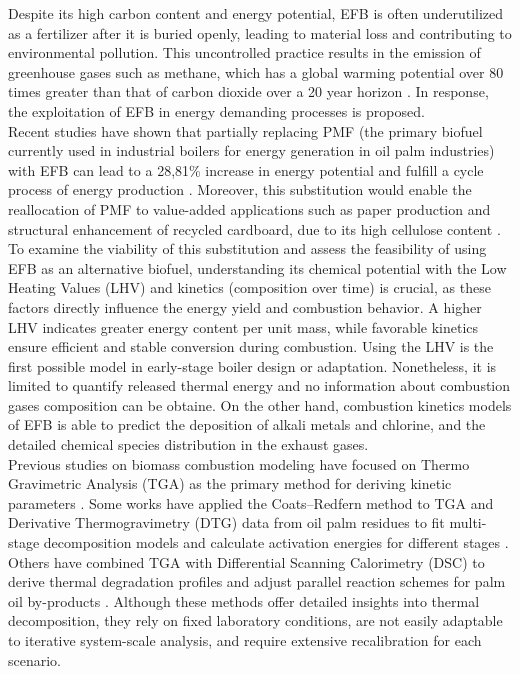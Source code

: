 \documentclass[preprint,12pt]{elsarticle}
\begin{document}
Despite its high carbon content and energy potential, EFB is often underutilized as a fertilizer after it is buried openly, leading to material loss and contributing to environmental pollution. This uncontrolled practice results in the emission of greenhouse gases such as methane, which has a global warming potential over 80 times greater than that of carbon dioxide over a 20 year horizon \cite{NacionesUnidasMetano}. In response, the exploitation of EFB in energy demanding processes is proposed.\\

Recent studies have shown that partially replacing PMF (the primary biofuel currently used in industrial boilers for energy generation in oil palm industries) with EFB can lead to a 28,81\% increase in energy potential and fulfill a cycle process of energy production \cite{BayonaRaquis}. Moreover, this substitution would enable the reallocation of PMF to value-added applications such as paper production and structural enhancement of recycled cardboard, due to its high cellulose content \cite{WanRosli2011, Angarita2009}. \\

To examine the viability of this substitution and assess the feasibility of using EFB as an alternative biofuel, understanding its chemical potential with the Low Heating Values (LHV) and kinetics (composition over time) is crucial, as these factors directly influence the energy yield and combustion behavior. A higher LHV indicates greater energy content per unit mass, while favorable kinetics ensure efficient and stable conversion during combustion. Using the LHV is the first possible model in early-stage boiler design or adaptation. Nonetheless, it is limited to quantify released thermal energy and no information about combustion gases composition can be obtaine. On the other hand, combustion kinetics models of EFB is able to predict the deposition of alkali metals and chlorine, and the detailed chemical species distribution in the exhaust gases. \\%

Previous studies on biomass combustion modeling have focused on Thermo Gravimetric Analysis (TGA) as the primary method for deriving kinetic parameters \cite{Khan2023}. Some works have applied the Coats–Redfern method to TGA and Derivative Thermogravimetry (DTG) data from oil palm residues to fit multi-stage decomposition models and calculate activation energies for different stages \cite{Ninduangdee2015, Jia2021}. Others have combined TGA with Differential Scanning Calorimetry (DSC) to derive thermal degradation profiles and adjust parallel reaction schemes for palm oil by-products \cite{GarciaNunez2006}. Although these methods offer detailed insights into thermal decomposition, they rely on fixed laboratory conditions, are not easily adaptable to iterative system-scale analysis, and require extensive recalibration for each scenario.\\
\end{document}
